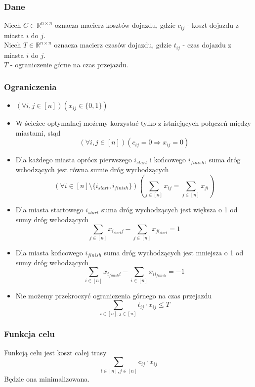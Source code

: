 \documentclass{article}
\begin{document}
\subsubsection{Dane}
Niech \(C\in\mathbb{R}^{n\times n}\) oznacza macierz kosztów dojazdu, gdzie \(c_{ij}\) - koszt dojazdu z miasta $i$ do $j$. \\
Niech \(T\in\mathbb{R}^{n\times n}\) oznacza macierz czasów dojazdu, gdzie \(t_{ij}\) - czas dojazdu z miasta $i$ do $j$. \\ $T$ - ograniczenie górne na czas przejazdu. 

\subsubsection{Ograniczenia}
\begin{itemize}
    \item \((\forall i,j\in [n])(x_{ij} \in \{0,1\})\)
    \item W ścieżce optymalnej możemy korzystać tylko z istniejących połączeń między miastami, stąd
    \[(\forall i,j\in[n])(c_{ij} = 0 \Rightarrow x_{ij} = 0)\]
    \item Dla każdego miasta oprócz pierwszego \(i_{start}\) i końcowego \(i_{finish}\), suma dróg wchodzących jest równa sumie dróg wychodzących
    \[(\forall i\in [n]\setminus\{i_{start},i_{finish}\})\left(\sum_{j\in[n]}x_{ij} = \sum_{j\in[n]} x_{ji}\right)\]
    \item Dla miasta startowego $i_{start}$ suma dróg wychodzących jest większa o 1 od sumy dróg wchodzących
    \[\sum_{j\in[n]}x_{i_{start}j} - \sum_{j\in[n]} x_{ji_{start}} = 1\]
    \item Dla miasta końcowego $i_{finish}$ suma dróg wychodzących jest mniejsza o 1 od sumy dróg wchodzących
    \[\sum_{i\in[n]}x_{i_{finish} i} - \sum_{i\in[n]} x_{ii_{finish}} = -1\]
    \item Nie możemy przekroczyć ograniczenia górnego na czas przejazdu
    \[\sum_{i\in[n],j\in[n]} t_{ij} \cdot x_{ij} \leq T\]
\end{itemize}

\subsubsection{Funkcja celu}
Funkcją celu jest koszt całej trasy
\[\sum_{i\in[n],j\in[n]} c_{ij} \cdot x_{ij}\]
Będzie ona minimalizowana.
\end{document}

